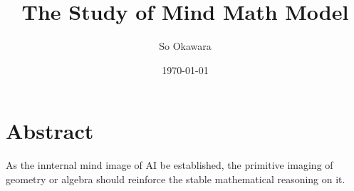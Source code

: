 \documentclass[a4paper, twocolumn,10pt]{article}
\author{So Okawara}
\date{\today}
\title{The Study of Mind Math Model}
\begin{document}
\maketitle
\section{Abstract}
As the innternal mind image of AI be established, the primitive imaging of geometry or algebra should reinforce the stable mathematical reasoning on it.  
\end{document}
